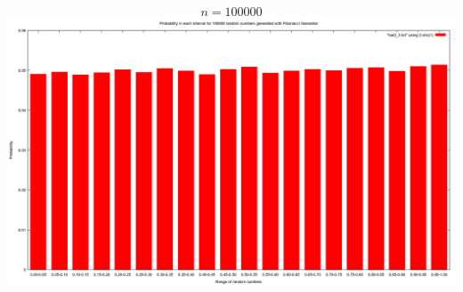 \documentclass{article}
\begin{document}
$$n = 100000$$
\includegraphics[scale=0.3]{"bar2_3"}
\pagebreak
\end{document}
